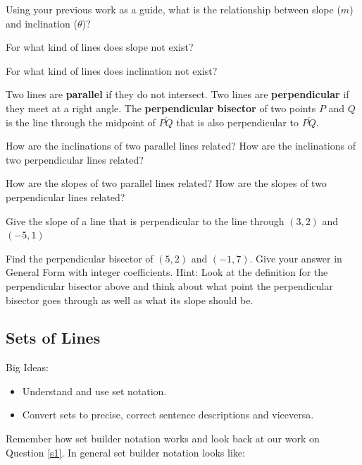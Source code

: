 \bq Using your previous work as a guide, what is the relationship between slope ($m$) and inclination ($\theta$)?
\eq
\bq \be \item For what kind of lines does slope not exist?
\item For what kind of lines does inclination not exist?
\ee
\eq

\begin{info} Two lines are \textbf{parallel} if they do not intersect. Two lines are \textbf{perpendicular} if they meet at a right angle. The \textbf{perpendicular bisector} of two points $P$ and $Q$ is the line through the midpoint of $\overline{PQ}$ that is also perpendicular to $\overline{PQ}$.
\end{info}

\bq How are the inclinations of two parallel lines related? How are the inclinations of two perpendicular lines related?
\eq

\bq How are the slopes of two parallel lines related? How are the slopes of two perpendicular lines related?
\eq

\bq Give the slope of a line that is perpendicular to the line through $(3,2)$ and $(-5,1)$
\eq

\bq Find the perpendicular bisector of $(5,2)$ and $(-1,7)$. Give your answer in General Form with integer coefficients. Hint: Look at the definition for the perpendicular bisector above and think about what point the perpendicular bisector goes through as well as what its slope should be.
\eq

\subsection{Sets of Lines}

\begin{annotation}
\end{annotation}
Big Ideas:
\begin{itemize}
\item Understand and use set notation.
\item Convert sets to precise, correct sentence descriptions and viceversa.
\end{itemize}

Remember how set builder notation works and look back at our work on Question \ref{s1}. In general set builder notation looks like:

